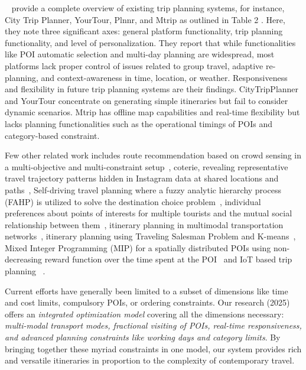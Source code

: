 ~\cite{sylejmani2011survey} provide a complete overview of existing trip planning systems, for instance, City Trip Planner, YourTour, Plnnr, and Mtrip as outlined in Table 2 . Here, they note three significant axes: general platform functionality, trip planning functionality, and level of personalization. They report that while functionalities like POI automatic selection and multi-day planning are widespread, most platforms lack proper control of issues related to group travel, adaptive re-planning, and context-awareness in time, location, or weather. Responsiveness and flexibility in future trip planning systems are their findings. CityTripPlanner and YourTour concentrate on generating simple itineraries but fail to consider dynamic scenarios. Mtrip has offline map capabilities and real-time flexibility but lacks planning functionalities such as the operational timings of POIs and category-based constraint.

Few other related work includes route recommendation based on crowd sensing in a multi-objective and multi-constraint setup~\cite{zheng2021novel}, coterie, revealing representative travel trajectory patterns hidden in Instagram data at shared locations and paths~\cite{yu2017mining}, Self-driving travel planning where a fuzzy analytic hierarchy process (FAHP) is utilized to solve the destination choice problem~\cite{jiaoman2018travel}, individual preferences about points of interests for multiple tourists and the mutual social relationship between them~\cite{sylejmani2017planning}, itinerary planning in multimodal transportation networks~\cite{zografos2008algorithms}, itinerary planning using Traveling Salesman Problem and K-means~\cite{rani2018development}, Mixed Integer Programming (MIP) for a spatially distributed POIs using non-decreasing reward function over the time spent at the POI~\cite{yu2014optimal} and IoT based trip planning ~\cite{arora2024itinerary}.   

Current efforts have generally been limited to a subset of dimensions like time and cost limits, compulsory POIs, or ordering constraints. Our research (2025) offers an \emph{integrated optimization model} covering all the dimensions necessary: \emph{multi-modal transport modes, fractional visiting of POIs, real-time responsiveness, and advanced planning constraints like working days and category limits}. By bringing together these myriad constraints in one model, our system provides rich and versatile itineraries in proportion to the complexity of contemporary travel.

